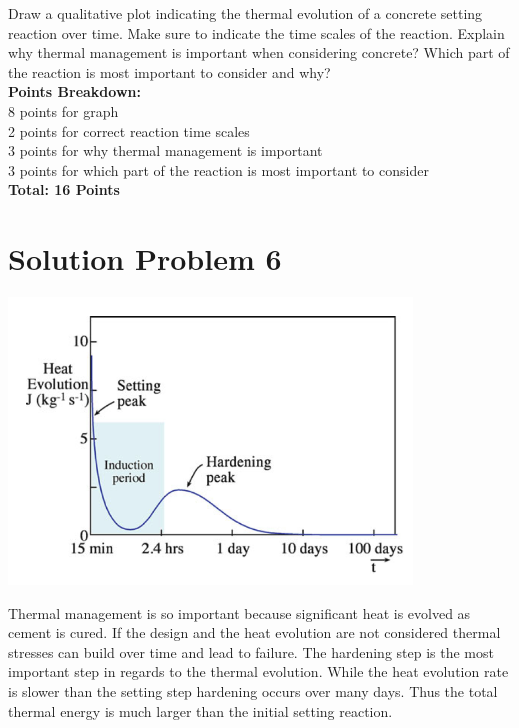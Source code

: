 \documentclass[12pt,letterpaper]{article}
\begin{document}
Draw a qualitative plot indicating the thermal evolution of a concrete setting reaction over time. Make sure to indicate the time scales of the reaction. Explain why thermal management is important when considering concrete? Which part of the reaction is most important to consider and why?\\

\textbf{Points Breakdown:}\\[12pt]
8 points for graph\\
2 points for correct reaction time scales\\
3 points for why thermal management is important\\
3 points for which part of the reaction is most important to consider\\[6 pt]
\textbf{Total: 16 Points}

\section*{Solution Problem 6}

\centering
\includegraphics[height=3in]{Heating profile.png}

\justifying
Thermal management is so important because significant heat is evolved as cement is cured. If the design and the heat evolution are not considered thermal stresses can build over time and lead to failure. The hardening step is the most important step in regards to the thermal evolution. While the heat evolution rate is slower than the setting step hardening occurs over many days. Thus the total thermal energy is much larger than the initial setting reaction. 
\end{document}
